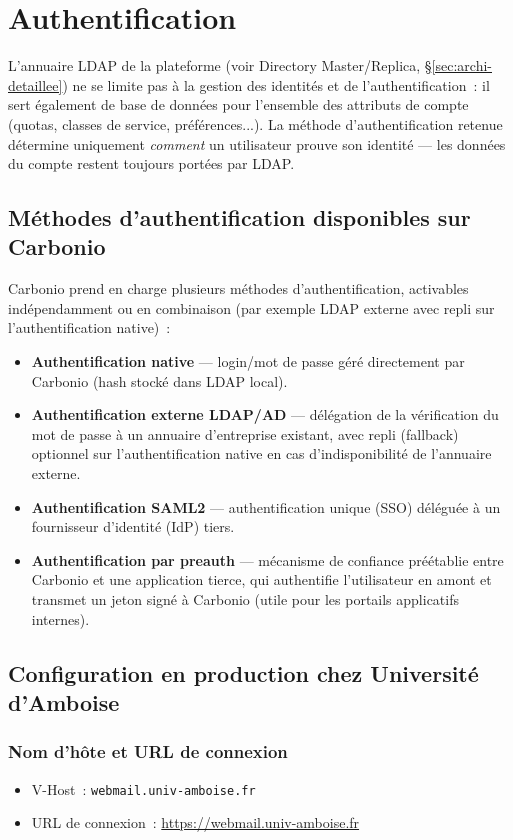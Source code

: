 \documentclass[11pt,a4paper]{report}
\begin{document}
\chapter{Authentification}
L'annuaire LDAP de la plateforme (voir Directory Master/Replica, \S\ref{sec:archi-detaillee}) ne se limite pas à la gestion des identités et de l'authentification~: il sert également de base de données pour l'ensemble des attributs de compte (quotas, classes de service, préférences...). La méthode d'authentification retenue détermine uniquement \emph{comment} un utilisateur prouve son identité --- les données du compte restent toujours portées par LDAP.

\section{Méthodes d'authentification disponibles sur Carbonio}
Carbonio prend en charge plusieurs méthodes d'authentification, activables indépendamment ou en combinaison (par exemple LDAP externe avec repli sur l'authentification native)~:
\begin{itemize}[nosep]
  \item \textbf{Authentification native} --- login/mot de passe géré directement par Carbonio (hash stocké dans LDAP local).
  \item \textbf{Authentification externe LDAP/AD} --- délégation de la vérification du mot de passe à un annuaire d'entreprise existant, avec repli (fallback) optionnel sur l'authentification native en cas d'indisponibilité de l'annuaire externe.
  \item \textbf{Authentification SAML2} --- authentification unique (SSO) déléguée à un fournisseur d'identité (IdP) tiers.
  \item \textbf{Authentification par preauth} --- mécanisme de confiance préétablie entre Carbonio et une application tierce, qui authentifie l'utilisateur en amont et transmet un jeton signé à Carbonio (utile pour les portails applicatifs internes).
\end{itemize}

\section{Configuration en production chez Université d'Amboise}

\subsection{Nom d'hôte et URL de connexion}
\begin{itemize}[nosep]
  \item V-Host~: \texttt{webmail.\allowbreak{}univ-\allowbreak{}amboise.\allowbreak{}fr }
  \item URL de connexion~: \url{https://webmail.univ-amboise.fr }
\end{itemize}
\end{document}
